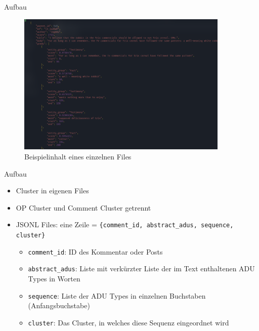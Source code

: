 \documentclass[compress,12pt]{beamer}
\begin{document}
    \begin{frame}{Aufbau}
        \begin{figure}
            \centering
            \includegraphics[width=0.9\textwidth]{../images/single-file-example}
            \caption{Beispielinhalt eines einzelnen Files}
            \label{fig:single-file-example}
        \end{figure}
    \end{frame}

    \begin{frame}{Aufbau}
        \begin{itemize}
            \item Cluster in eigenen Files
            \item OP Cluster und Comment Cluster getrennt
            \item JSONL Files: eine Zeile = \texttt{\{comment\_id, abstract\_adus, sequence, cluster\}}
            \begin{itemize}
                \item \texttt{comment\_id}: ID des Kommentar oder Posts
                \item \texttt{abstract\_adus}: Liste mit verkürzter Liste der im Text enthaltenen ADU Types in Worten
                \item \texttt{sequence}: Liste der ADU Types in einzelnen Buchstaben (Anfangsbuchstabe)
                \item \texttt{cluster}: Das Cluster, in welches diese Sequenz eingeordnet wird
            \end{itemize}
        \end{itemize}
    \end{frame}
\end{document}
